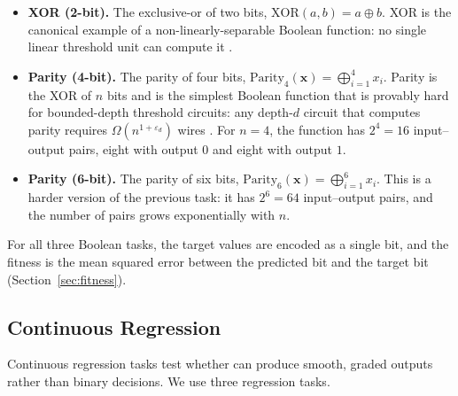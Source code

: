 \begin{itemize}
  \item \textbf{XOR (2-bit).} The exclusive-or of two bits,
    $\text{XOR}(a, b) = a \oplus b$. XOR is the canonical example of
    a non-linearly-separable Boolean function: no single linear
    threshold unit can compute it \citep{minsky1969perceptrons}.

  \item \textbf{Parity (4-bit).} The parity of four bits,
    $\text{Parity}_4(\mathbf{x}) = \bigoplus_{i=1}^{4} x_i$. Parity
    is the XOR of $n$ bits and is the simplest Boolean function that
    is provably hard for bounded-depth threshold circuits: any depth-$d$
    circuit that computes parity requires $\Omega(n^{1+\varepsilon_d})$
    wires \citep{impagliazzo1997size}. For $n = 4$, the function has
    $2^4 = 16$ input--output pairs, eight with output $0$ and eight
    with output $1$.

  \item \textbf{Parity (6-bit).} The parity of six bits,
    $\text{Parity}_6(\mathbf{x}) = \bigoplus_{i=1}^{6} x_i$. This is
    a harder version of the previous task: it has $2^6 = 64$
    input--output pairs, and the number of pairs grows exponentially
    with $n$.
\end{itemize}

For all three Boolean tasks, the target values are encoded as a
single bit, and the fitness is the mean squared error between the
predicted bit and the target bit (Section~\ref{sec:fitness}).

\subsection{Continuous Regression}

Continuous regression tasks test whether \modnet{} can produce smooth,
graded outputs rather than binary decisions. We use three regression
tasks.

